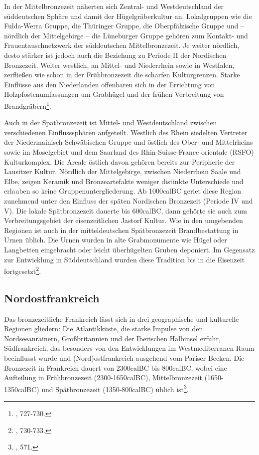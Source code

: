 \documentclass[openany,twoside,twocolumn]{book}
\let\rmarkdownfootnote\footnote%
\def\footnote{\protect\rmarkdownfootnote}
\begin{document}
In der Mittelbronzezeit näherten sich Zentral- und Westdeutschland der
süddeutschen Sphäre und damit der Hügelgräberkultur an. Lokalgruppen wie
die Fulda-Werra Gruppe, die Thüringer Gruppe, die Oberpfälzische Gruppe
und -- nördlich der Mittelgebirge -- die Lüneburger Gruppe gehören zum
Kontakt- und Frauentauschnetzwerk der süddeutschen Mittelbronzezeit. Je
weiter nördlich, desto stärker ist jedoch auch die Beziehung zu Periode
II der Nordischen Bronzezeit. Weiter westlich, an Mittel- und
Niederrhein sowie in Westfalen, zerfließen wie schon in der
Frühbronzezeit die scharfen Kulturgrenzen. Starke Einflüsse aus den
Niederlanden offenbaren sich in der Errichtung von
Holzpfostenumfassungen um Grabhügel und der frühen Verbreitung von
Brandgräbern\footnote{\textcite{jockenhovel_germany_2013}, 727-730.}.

Auch in der Spätbronzezeit ist Mittel- und Westdeutschland zwischen
verschiedenen Einflusssphären aufgeteilt. Westlich des Rhein siedelten
Vertreter der Niedermainisch-Schwäbischen Gruppe und östlich des Ober-
und Mittelrheins sowie im Moselgebiet und dem Saarland des
Rhin-Suisse-France orientale (RSFO) Kulturkomplex. Die Areale östlich
davon gehören bereits zur Peripherie der Lausitzer Kultur. Nördlich der
Mittelgebirge, zwischen Niederrhein Saale und Elbe, zeigen Keramik und
Bronzeartefakte weniger distinkte Unterschiede und erlauben so keine
Gruppenuntergliederung. Ab 1000calBC geriet diese Region zunehmend unter
den Einfluss der späten Nordischen Bronzezeit (Periode IV und V). Die
lokale Spätbronzezeit dauerte bis 600calBC, dann gehörte sie auch zum
Verbreitungsgebiet der eisenzeitlichen Jastorf Kultur. Wie in den
umgebenden Regionen ist auch in der mitteldeutschen Spätbronzezeit
Brandbestattung in Urnen üblich. Die Urnen wurden in alte Grabmonumente
wie Hügel oder Langbetten eingebracht oder leicht überhügelten Gruben
deponiert. Im Gegensatz zur Entwicklung in Süddeutschland wurden diese
Tradition bis in die Eisenzeit fortgesetzt\footnote{\textcite{jockenhovel_germany_2013},
  730-733.}.

\hypertarget{nordostfrankreich}{%
\subsection{Nordostfrankreich}\label{nordostfrankreich}}

Das bronzezeitliche Frankreich lässt sich in drei geographische und
kulturelle Regionen gliedern: Die Atlantikküste, die starke Impulse von
den Nordseeanrainern, Großbritannien und der Iberischen Halbinsel
erfuhr, Südfrankreich, das besonders von den Entwicklungen im
Westmediterranen Raum beeinflusst wurde und (Nord)ostfrankreich
ausgehend vom Pariser Becken. Die Bronzezeit in Frankreich dauert von
2300calBC bis 800calBC, wobei eine Aufteilung in Frühbronzezeit
(2300-1650calBC), Mittelbronzezeit (1650-1350calBC) und Spätbronzezeit
(1350-800calBC) üblich ist\footnote{\textcite{mordant_bronze_2013}, 571.}.
\end{document}
